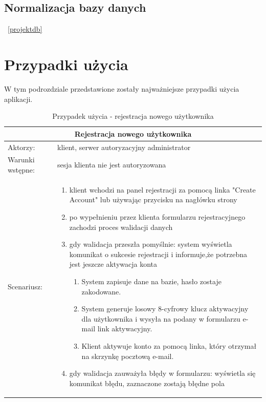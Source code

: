 \subsection{Normalizacja bazy danych}
~\ref{projektdb}

\clearpage
\section{Przypadki użycia}

W tym podrozdziale przedstawione zostały najważniejsze przypadki użycia aplikacji.


\begin{table}[h!]

\begin{tabular}{ |p{2cm}||p{13cm}|  }
	
	\hline
	\multicolumn{2}{|c|}{Rejestracja nowego użytkownika} \\
	\hline
	Aktorzy: &klient, serwer autoryzacyjny administrator\\
	\hline
	Warunki wstępne: & sesja klienta nie jest autoryzowana\\ 
	\hline
	Scenariusz: &
	\begin{enumerate}[leftmargin=0em]
		\item klient wchodzi na panel rejestracji za pomocą linka "Create Account" lub używając przycisku na nagłówku strony 
		
		\item po wypełnieniu przez klienta formularzu rejestracyjnego zachodzi proces walidacji danych

		\item  gdy walidacja przeszła pomyślnie: system wyświetla komunikat o sukcesie rejestracji i informuje,że potrzebna jest jeszcze aktywacja konta

	\begin{enumerate}[leftmargin=2em]
	 	\item  System zapisuje dane na bazie, hasło zostaje zakodowane.
	 		
	 		\item  System generuje losowy 8-cyfrowy klucz aktywacyjny dla użytkownika i wysyła na podany w formularzu e-mail link aktywacyjny.
	 		
	 		\item Klient  aktywuje konto za pomocą linka, który otrzymał na skrzynkę pocztową e-mail.
	\end{enumerate}
		
		\item  gdy walidacja zauważyła błędy w formularzu: wyświetla się komunikat błędu, zaznaczone zostają błędne pola
			\end{enumerate}\\
	\hline

\end{tabular}

	\caption{Przypadek użycia - rejestracja nowego użytkownika}
\end{table}

